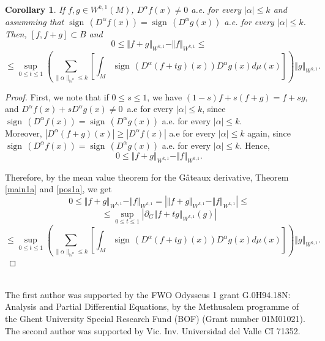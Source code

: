 \documentclass[a4paper,12pt,reqno]{amsart}%
\newtheorem{corollary}[theorem]{Corollary}
\theoremstyle{definition}
\numberwithin{equation}{section}
\numberwithin{theorem}{section}
\DeclareMathOperator*{\sign}{sign\,}
\begin{document}
\begin{corollary} If $f, g\in W^{k,1}(M)$,  $D^{\alpha}f(x)\neq 0$ a.e. for every $|\alpha|\leq k$ and assumming that  $\sign(D^{\alpha}f(x))=\sign(D^{\alpha}g(x))$ a.e. for every $|\alpha|\leq k$. Then, $[f,f+g]\subset B$ and  
\[0\leq \Vert f+g\Vert_{W^{k,1}}-\Vert f \Vert_{W^{k,1}}\leq\]\[\leq \sup\limits_{0\leq t\leq 1}\left(\sum_{\|\alpha\|_{\mathbb{N}^{n}}\leq k}\left[ \int_{M  } \sign(D^{\alpha}(f+tg)(x))D^{\alpha}g(x)d\mu(x)\right]\right)\Vert g \Vert_{W^{k,1}}.\]
\end{corollary}
\begin{proof} First, we note that if $0\leq s \leq 1$, we have $(1-s)f+s(f+g)=f+sg$, and $D^{\alpha}f(x)+sD^{\alpha}g(x)\neq 0 \,$ a.e for every  $|\alpha|\leq k$, since 
 $\sign(D^{\alpha}f(x))=\sign(D^{\alpha}g(x))$ a.e. for every $|\alpha|\leq k$.\\

Moreover, $|D^{\alpha}(f+g)(x)|\geq |D^{\alpha}f(x)|$ a.e for every  $|\alpha|\leq k$ again, since $\sign(D^{\alpha}f(x))=\sign(D^{\alpha}g(x))$ a.e. for every $|\alpha|\leq k$. Hence, 
\begin{equation}\label{pos1a}
0\leq \Vert f+g\Vert_{W^{k,1}}-\Vert f \Vert_{W^{k,1}}.
\end{equation}

Therefore, by the mean value theorem for the G\^ateaux derivative, Theorem \ref{main1a} and \eqref{pos1a}, we get
\[0\leq \Vert f+g\Vert_{W^{k,1}}-\Vert f \Vert_{W^{k,1}}=|\Vert f+g\Vert_{W^{k,1}}-\Vert f \Vert_{W^{k,1}}|\leq\]
\[\leq\sup\limits_{0\leq t\leq 1}|\partial_{G}\Vert f+tg \Vert_{W^{k,1}}(g)|\]
\[\leq\sup\limits_{0\leq t\leq 1}\left(\sum_{\|\alpha\|_{\mathbb{N}^{n}}\leq k}\left[ \int_{M  } \sign(D^{\alpha}(f+tg)(x))D^{\alpha}g(x)d\mu(x)\right]\right)\Vert g \Vert_{W^{k,1}}.\]

    
\end{proof}

\\
\noindent The first author was supported  by the FWO  O\textnormal{d}ysseus  1  grant  G.0H94.18N:  Analysis  and  Partial Differential Equations, by the Methusalem programme of the Ghent University Special Research Fund (BOF)
(Grant number 01M01021). The second  author was supported by Vic. Inv. Universidad del Valle CI 71352.\\

\end{document}
